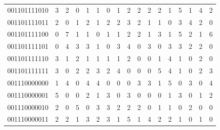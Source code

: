 \documentclass[10pt,a4paper]{article}
\begin{document}
\begin{longtable}{ |c|c|c|c|c|c|c|c|c|c|c|c|c|c|c|c|c| }
    001101111010              & 3                            & 2                                & 0                            & 1                              & 1   & 0   & 1   & 2   & 2   & 2   & 2   & 1   & 5   & 1   & 4   & 2   \\
    001101111011              & 2                            & 0                                & 1                            & 2                              & 1   & 2   & 2   & 3   & 2   & 1   & 1   & 0   & 3   & 4   & 2   & 0   \\
    001101111100              & 0                            & 7                                & 1                            & 1                              & 0   & 1   & 1   & 2   & 2   & 1   & 3   & 1   & 5   & 2   & 1   & 6   \\
    001101111101              & 0                            & 4                                & 3                            & 3                              & 1   & 0   & 3   & 4   & 0   & 3   & 0   & 3   & 3   & 2   & 2   & 0   \\
    001101111110              & 3                            & 1                                & 2                            & 1                              & 1   & 1   & 1   & 2   & 0   & 0   & 1   & 4   & 1   & 0   & 2   & 0   \\
    001101111111              & 3                            & 0                                & 2                            & 2                              & 3   & 2   & 4   & 0   & 0   & 0   & 5   & 4   & 1   & 0   & 2   & 3   \\
    001110000000              & 1                            & 4                                & 0                            & 4                              & 4   & 0   & 0   & 0   & 3   & 3   & 1   & 5   & 0   & 3   & 0   & 4   \\
    001110000001              & 5                            & 0                                & 0                            & 2                              & 1   & 3   & 0   & 3   & 0   & 0   & 0   & 1   & 3   & 0   & 1   & 2   \\
    001110000010              & 2                            & 0                                & 5                            & 0                              & 3   & 3   & 2   & 2   & 2   & 0   & 1   & 1   & 0   & 2   & 0   & 0   \\
    001110000011              & 2                            & 2                                & 1                            & 3                              & 2   & 3   & 1   & 5   & 1   & 4   & 2   & 2   & 1   & 0   & 1   & 0   \\

\end{longtable}
\end{document}
